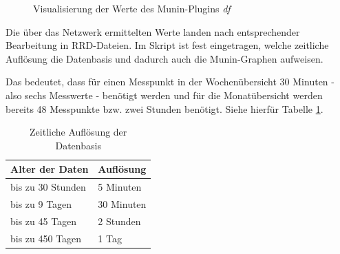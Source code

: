 \begin{figure}[ht]
	\centering
		\caption{Visualisierung der Werte des Munin-Plugins \textit{df}}
		\label{df-graph}
\end{figure}

Die über das Netzwerk ermittelten Werte landen nach entsprechender Bearbeitung in RRD-Dateien. 
Im Skript  ist fest eingetragen, welche zeitliche Auflösung die Datenbasis und dadurch auch die Munin-Graphen aufweisen.

Das bedeutet, dass für einen Messpunkt in der Wochenübersicht 30 Minuten - also sechs Messwerte - benötigt werden und für die Monatübersicht werden bereits 48 Messpunkte bzw. zwei Stunden benötigt. Siehe hierfür Tabelle \ref{timeres-tab}.

\begin{table}[!htbp]
\centering
\begin{tabular}{l l}
\textbf{Alter der Daten } \hspace{10 mm} & \textbf{Auflösung} \hspace{10 mm} \\
\hline
bis zu 30 Stunden & 5 Minuten  \\
\hline
bis zu 9 Tagen & 30 Minuten \\
\hline
bis zu 45 Tagen & 2 Stunden \\
\hline
bis zu 450 Tagen & 1 Tag \\
\bottomrule
\end{tabular}
\caption[Zeitliche Auflösung der Datenbasis]{Zeitliche Auflösung der Datenbasis\protect\footnotemark}
\label{timeres-tab}
\end{table}


